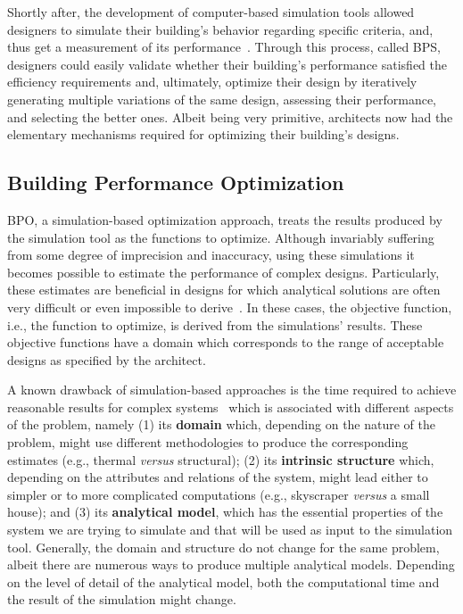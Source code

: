 	Shortly after, the development of computer-based simulation tools allowed designers to simulate their building's behavior regarding specific criteria, and, thus get a measurement of its performance~\cite{Malkawi2005}. Through this process, called \ac{BPS}, designers could easily validate whether their building's performance satisfied the efficiency requirements and, ultimately, optimize their design by iteratively generating multiple variations of the same design, assessing their performance, and selecting the better ones. Albeit being very primitive, architects now had the elementary mechanisms required for optimizing their building's designs.

\subsection{Building Performance Optimization}

	\ac{BPO}, a simulation-based optimization approach, treats the results produced by the simulation tool as the functions to optimize. Although invariably suffering from some degree of imprecision and inaccuracy, using these simulations it becomes possible to estimate the performance of complex designs. Particularly, these estimates are beneficial in designs for which analytical solutions are often very difficult or even impossible to derive~\cite{Kolda2003}. In these cases, the objective function, i.e., the function to optimize, is derived from the simulations' results. These objective functions have a domain which corresponds to the range of acceptable designs as specified by the architect.

	A known drawback of simulation-based approaches is the time required to achieve reasonable results for complex systems~\cite{Law1991} which is associated with different aspects of the problem, namely (1) its \textbf{domain} which, depending on the nature of the problem, might use different methodologies to produce the corresponding estimates (e.g., thermal \textit{versus} structural); (2) its \textbf{intrinsic structure} which, depending on the attributes and relations of the system, might lead either to simpler or to more complicated computations (e.g., skyscraper \textit{versus} a small house); and (3) its \textbf{analytical model}, which has the essential properties of the system we are trying to simulate and that will be used as input to the simulation tool. Generally, the domain and structure do not change for the same problem, albeit there are numerous ways to produce multiple analytical models. Depending on the level of detail of the analytical model, both the computational time and the result of the simulation might change. 

